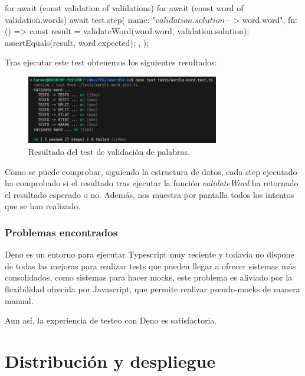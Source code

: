 \begin{mytypescript}[float={!h},caption={Implementación del sistema de creación de test automáticos.},label={alg:deno_tests_2}]
	for await (const validation of validations) {
		for await (const word of validation.words) {
			await test.step({
				name: "${validation.solution} -> ${word.word}",
				fn: () => {
					const result = validateWord(word.word, validation.solution);
					assertEquals(result, word.expected);
				},
			});
		}
	}
\end{mytypescript}

Tras ejecutar este test obtenemos los siguientes resultados:

\begin{figure}[H]
	\centering
	\includegraphics[clip=true, width=0.75\textwidth]{images/tests/deno_test_wordle.png}
	\caption{Resultado del test de validación de palabras.}
	\label{fig:deno_test}
\end{figure}

Como se puede comprobar, siguiendo la estructura de datos, cada step ejecutado ha comprobado si el resultado tras ejecutar la función \textit{validateWord} ha retornado el resultado esperado o no. Además, nos muestra por pantalla todos los intentos que se han realizado.

\subsubsection{Problemas encontrados}
Deno es un entorno para ejecutar Typescript muy reciente y todavía no dispone de todas las mejoras para realizar tests que pueden llegar a ofrecer sistemas más consolidados, como sistemas para hacer mocks, este problema es aliviado por la flexibilidad ofrecida por Javascript, que permite realizar pseudo-mocks de manera manual.

Aun así, la experiencia de testeo con Deno es satisfactoria.

\section{Distribución y despliegue}

